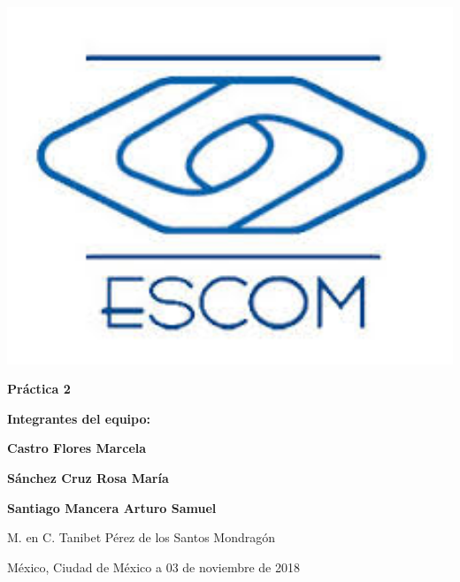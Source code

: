 \begin{minipage}{0.20\textwidth}
\includegraphics[width=1\textwidth]{portada/escom.jpg}

\end{minipage}%

\vspace{3cm}
\centerline{\Large \bf Práctica 2}


\vspace{2cm}
\centerline{\Large  \bf Integrantes del equipo:}
\vspace{1cm}
\centerline{\Large  \bf Castro Flores Marcela}
\vspace{.2cm}
\centerline{\Large  \bf Sánchez Cruz Rosa María}
\vspace{.2cm}
\centerline{\Large  \bf Santiago Mancera Arturo Samuel}

\vspace{2cm}

\centerline{\Large  M. en C. Tanibet Pérez de los Santos Mondragón }
 
\vspace{2cm}
\begin{center}
{\large  M\'{e}xico, Ciudad de México a 03 de noviembre de 2018}
\end{center}
